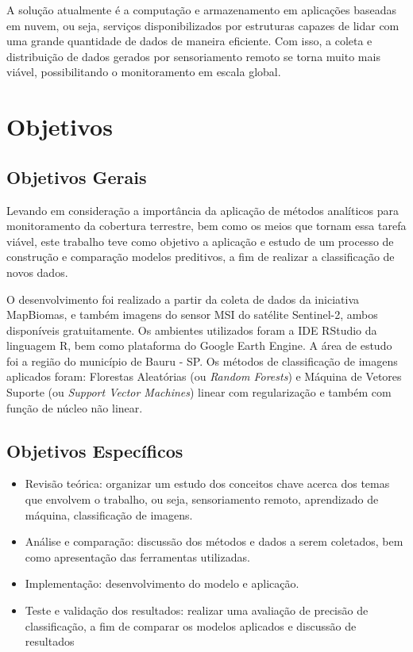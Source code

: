 A solução atualmente é a computação e armazenamento em aplicações
baseadas em nuvem, ou seja, serviços disponibilizados por estruturas
capazes de lidar com uma grande quantidade de dados de maneira
eficiente. Com isso, a coleta e distribuição de dados gerados por
sensoriamento remoto se torna muito mais viável, possibilitando o
monitoramento em escala global. \cite{eoosi}

\section{Objetivos}\label{objetivos}

\subsection{Objetivos Gerais}\label{objetivos-gerais}

Levando em consideração a importância da aplicação de métodos
analíticos para monitoramento da cobertura terrestre, bem como os meios
que tornam essa tarefa viável, este trabalho teve como objetivo a
aplicação e estudo de um processo de construção e comparação modelos
preditivos, a fim de realizar a classificação de novos dados.

O desenvolvimento foi realizado a partir da coleta de dados da
iniciativa MapBiomas, e também imagens do sensor MSI do satélite
Sentinel-2, ambos disponíveis gratuitamente. Os ambientes
utilizados foram a IDE RStudio da linguagem R, bem como
plataforma do Google Earth Engine. A área de estudo foi a região
do município de Bauru - SP. Os métodos de classificação de imagens
aplicados foram: Florestas Aleatórias (ou \emph{Random Forests}) e
Máquina de Vetores Suporte (ou \emph{Support Vector Machines}) linear com regularização e também com função de núcleo não linear.

\subsection{Objetivos Específicos}\label{objetivos-especificos}

\begin{itemize}
\itemsep1pt\parskip0pt
\item
  Revisão teórica: organizar um estudo dos conceitos chave acerca dos
  temas que envolvem o trabalho, ou seja, sensoriamento remoto,
  aprendizado de máquina, classificação de imagens.
\item
  Análise e comparação: discussão dos métodos e dados a serem coletados,
  bem como apresentação das ferramentas utilizadas.
\item
  Implementação: desenvolvimento do modelo e aplicação.
\item
  Teste e validação dos resultados: realizar uma avaliação de precisão
  de classificação, a fim de comparar os modelos aplicados e discussão
  de resultados
\end{itemize}
